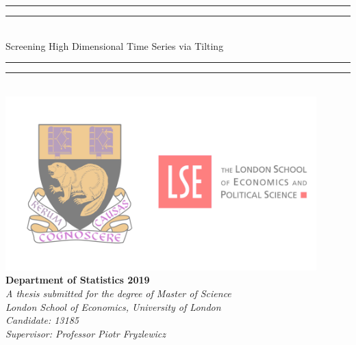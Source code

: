 \documentclass[11pt]{report}\usepackage[utf8]{inputenc}
\begin{document}

\begin{titlepage}
\begin{center}
\rule[0.5ex]{\linewidth}{2pt}\vspace*{-\baselineskip}\vspace*{3.2pt}
\rule[0.5ex]{\linewidth}{1pt}\\[\baselineskip]
{\HUGE \Large Screening High Dimensional Time Series via Tilting}\\[0.5cm]
\rule[0.5ex]{\linewidth}{1pt}\vspace*{-\baselineskip}\vspace{3.2pt}
\rule[0.5ex]{\linewidth}{2pt}\\[2.5cm]

\includegraphics[width = 0.9\textwidth]{../plots/LSE_logo.png}\\[2.5cm]

\textbf{Department of Statistics 2019}\\[0.5cm]
\textit{A thesis submitted for the degree of Master of Science}\\
\textit{London School of Economics, University of London}\\[0.5cm]
\textit{Candidate: 13185}\\
\textit{Supervisor: Professor Piotr Fryzlewicz}
\end{center}
\end{titlepage}

\renewcommand\thepage{\romannumeral\numexpr\value{page}\relax}
\end{document}
